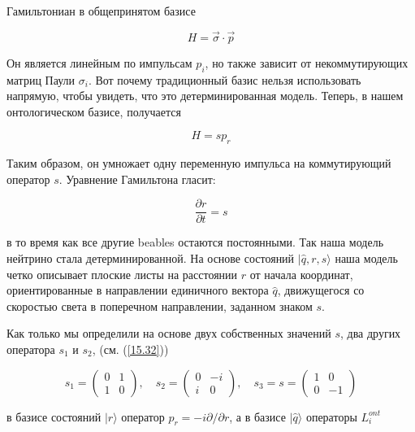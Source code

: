 \documentclass[main.tex]{subfiles}
\begin{document}
Гамильтониан в общепринятом базисе

\begin{equation}\label{15.62}
	H=\vec{\sigma} \cdot \vec{p}
\end{equation}

Он является линейным по импульсам $p_i$, но также зависит от некоммутирующих матриц Паули $\sigma_i$. Вот почему традиционный базис нельзя использовать напрямую, чтобы увидеть, что это детерминированная модель. Теперь, в нашем онтологическом базисе, получается

\begin{equation}\label{15.63}
	H = sp_r
\end{equation}

Таким образом, он умножает одну переменную импульса на коммутирующий оператор $s$. Уравнение Гамильтона гласит:

\begin{equation}\label{15.64}
	\frac{\partial r}{\partial t} = s
\end{equation}

в то время как все другие beables остаются постоянными. Так наша модель нейтрино стала детерминированной. На основе состояний $|\hat q, r,s\rangle$ наша модель четко описывает плоские листы на расстоянии $r$ от начала координат, ориентированные в направлении единичного вектора $\hat q$, движущегося со скоростью света в поперечном направлении, заданном знаком $s$.

Как только мы определили на основе двух собственных значений $s$, два других оператора $s_1$ и $s_2$,  (см. (\ref{15.32}))

\begin{equation}\label{15.65}
	s_{1}=\left(\begin{array}{cc}
{0} & {1} \\
{1} & {0}
\end{array}\right), \quad s_{2}=\left(\begin{array}{cc}
{0} & {-i} \\
{i} & {0}
\end{array}\right), \quad s_{3}=s=\left(\begin{array}{cc}
{1} & {0} \\
{0} & {-1}
\end{array}\right)
\end{equation}

в базисе состояний $|r\rangle$ оператор $p_r = -i\partial / \partial r$, а в базисе $|\hat q\rangle$ операторы $L_i^{ont}$
\end{document}
